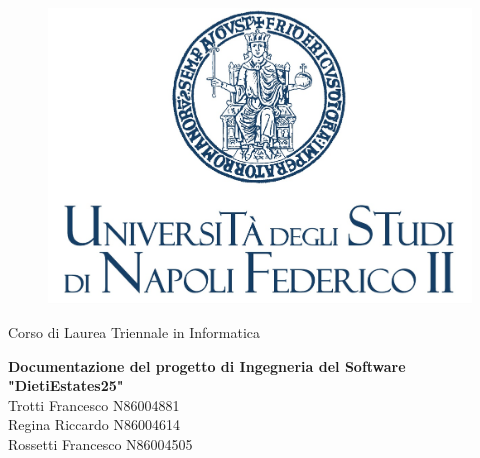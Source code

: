 \begin{titlepage}
\begin{figure}[!htb]
    \centering
    \includegraphics[keepaspectratio=true, width=0.5\linewidth]{assets/Federico_II.jpg}
\end{figure}

\begin{center}
    \vspace{10mm}
    \LARGE{Corso di Laurea Triennale in Informatica}
\end{center}

\vspace{10mm}
\begin{center}
    \LARGE{\bf{Documentazione del progetto di Ingegneria del Software "DietiEstates25"\\}}
    \vspace{20mm}
    \Large{Trotti Francesco N86004881\\}
    \Large{Regina Riccardo N86004614\\}
    \Large{Rossetti Francesco N86004505\\}
\end{center}


\vspace{30mm}


\hrulefill
\\

\end{titlepage}